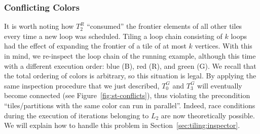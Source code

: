 \subsubsection*{Conflicting Colors}
It is worth noting how $T_2^R$ ``consumed'' the frontier elements of all other tiles every time a new loop was scheduled. Tiling a loop chain consisting of $k$ loops had the effect of expanding the frontier of a tile of at most $k$ vertices. With this in mind, we re-inspect the loop chain of the running example, although this time with a different execution order: blue (B), red (R), and green (G). We recall that the total ordering of colors is arbitrary, so this situation is legal. By applying the same inspection procedure that we just described, $T_0^G$ and $T_3^G$ will eventually become connected (see Figure~\ref{fig:st-conflicts}), thus violating the precondition ``tiles/partitions with the same color can run in parallel''. Indeed, race conditions during the execution of iterations belonging to $L_2$ are now theoretically possible. We will explain how to handle this problem in Section~\ref{sec:tiling:inspector}.

